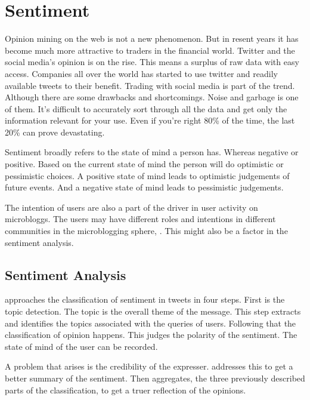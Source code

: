\section{Sentiment}

Opinion mining on the web is not a new phenomenon. But in resent years it has
become much more attractive to traders in the financial world. Twitter and the
social media's opinion is on the rise. This means a surplus of raw data with
easy access. Companies all over the world has started to use twitter and
readily available tweets to their benefit. Trading with social media is part of
the trend. Although there are some drawbacks and shortcomings. Noise and
garbage is one of them. It's difficult to accurately sort through all the data
and get only the information relevant for your use. Even if you're right 80\% of
the time, the last 20\% can prove devastating.
\cite[]{stevenson12:social_media_stock_pickers}

Sentiment broadly refers to the state of mind a person has. Whereas negative or
positive. Based on the current state of mind the person will do optimistic or
pessimistic choices. A positive state of mind leads to optimistic judgements of
future events. And a negative state of mind leads to pessimistic judgements.
\cite[p4]{doukas10:sentiment_and_momentum}

The intention of users are also a part of the driver in user activity on
microbloggs. The users may have different roles and intentions in different
communities in the microblogging sphere, \cite[]{java07}. This might also be a
factor in the sentiment analysis.

\subsection{Sentiment Analysis}


\cite[]{Li2013206} approaches the classification of sentiment in tweets in four
steps. First is the topic detection. The topic is the overall theme of the
message. This step extracts and identifies the topics associated with the
queries of users. Following that the classification of opinion happens. This
judges the polarity of the sentiment. The state of mind of the user can be
recorded.

A problem that arises is the credibility of the expresser. \cite[]{Li2013206} addresses this to
get a better summary of the sentiment. Then aggregates, the
three previously described parts of the classification, to get a truer
reflection of the opinions.

